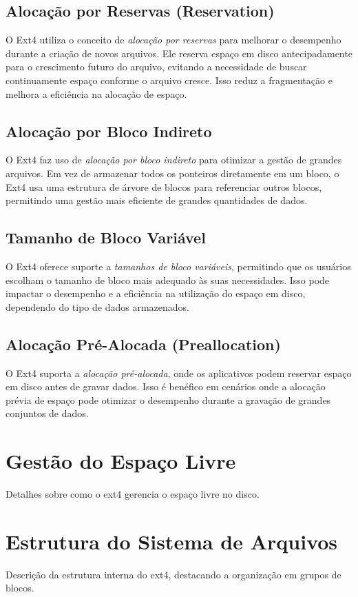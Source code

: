 \documentclass[
	12pt,				%
	openright,			%
	oneside,			%
	a4paper,			%
	chapter=TITLE,		%
	english,			%
	french,				%
	spanish,			%
	brazil				%
	]{abntex2}
\theoremstyle{definition}
\begin{document}
\section{Alocação por Reservas (Reservation)}
O Ext4 utiliza o conceito de \textit{alocação por reservas} para melhorar o desempenho durante a criação de novos arquivos. Ele reserva espaço em disco antecipadamente para o crescimento futuro do arquivo, evitando a necessidade de buscar continuamente espaço conforme o arquivo cresce. Isso reduz a fragmentação e melhora a eficiência na alocação de espaço.

\section{Alocação por Bloco Indireto}
O Ext4 faz uso de \textit{alocação por bloco indireto} para otimizar a gestão de grandes arquivos. Em vez de armazenar todos os ponteiros diretamente em um bloco, o Ext4 usa uma estrutura de árvore de blocos para referenciar outros blocos, permitindo uma gestão mais eficiente de grandes quantidades de dados.

\section{Tamanho de Bloco Variável}
O Ext4 oferece suporte a \textit{tamanhos de bloco variáveis}, permitindo que os usuários escolham o tamanho de bloco mais adequado às suas necessidades. Isso pode impactar o desempenho e a eficiência na utilização do espaço em disco, dependendo do tipo de dados armazenados.

\section{Alocação Pré-Alocada (Preallocation)}
O Ext4 suporta a \textit{alocação pré-alocada}, onde os aplicativos podem reservar espaço em disco antes de gravar dados. Isso é benéfico em cenários onde a alocação prévia de espaço pode otimizar o desempenho durante a gravação de grandes conjuntos de dados.

\chapter{Gestão do Espaço Livre}
Detalhes sobre como o ext4 gerencia o espaço livre no disco.

\chapter{Estrutura do Sistema de Arquivos}
Descrição da estrutura interna do ext4, destacando a organização em grupos de blocos.
\end{document}

